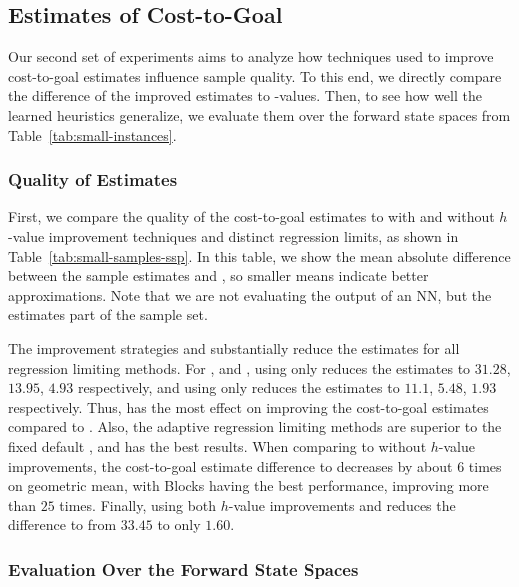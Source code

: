 

\subsection{Estimates of Cost-to-Goal}

Our second set of experiments aims to analyze how techniques used to improve cost-to-goal estimates influence sample quality. To this end, we directly compare the difference of the improved estimates to \hstar-values. Then, to see how well the learned heuristics generalize, we evaluate them over the forward state spaces from Table~\ref{tab:small-instances}.

\subsubsection{Quality of Estimates}

First, we compare the quality of the cost-to-goal estimates to \hstar with and without $h$-value improvement techniques and distinct regression limits, as shown in Table~\ref{tab:small-samples-ssp}. In this table, we show the mean absolute difference between the sample estimates and \hstar, so smaller means indicate better approximations. Note that we are not evaluating the output of an NN, but the estimates part of the sample set.



The improvement strategies \hmin and \hvfc substantially reduce the estimates for all regression limiting methods. For , \facts and \meanfx, using only \hmin reduces the estimates to $31.28$, $13.95$, $4.93$ respectively, and using only \hvfc reduces the estimates to $11.1$, $5.48$, $1.93$ respectively. Thus, \hvfc has the most effect on improving the cost-to-goal estimates compared to \hmin.
Also, the adaptive regression limiting methods are superior to the fixed default , and \meanfx has the best results. When comparing  to \meanfx without $h$-value improvements, the cost-to-goal estimate difference to \hstar decreases by about $6$ times on geometric mean, with Blocks having the best performance, improving more than $25$ times. Finally, using both $h$-value improvements and \meanfx reduces the difference to \hstar from $33.45$ to only $1.60$.

\subsubsection{Evaluation Over the Forward State Spaces}

